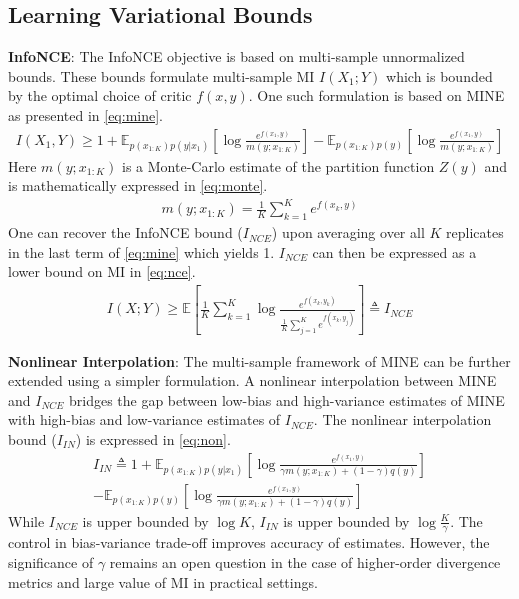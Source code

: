 \documentclass{article}
\begin{document}
\subsection{Learning Variational Bounds}
\textbf{InfoNCE}: The InfoNCE objective is based on multi-sample unnormalized bounds. These bounds formulate multi-sample MI $I(X_{1};Y)$ which is bounded by the optimal choice of critic $f(x,y)$. One such formulation is based on MINE \cite{mine} as presented in \autoref{eq:mine}.
\begin{gather}
  I(X_{1},Y) \geq 1 + \mathbb{E}_{p(x_{1:K})p(y|x_{1})}[\log\frac{e^{f(x_{1},y)}}{m(y;x_{1:K})}] - \mathbb{E}_{p(x_{1:K})p(y)}[\log\frac{e^{f(x_{1},y)}}{m(y;x_{1:K})}] \label{eq:mine}
\end{gather} 
Here $m(y;x_{1:K})$ is a Monte-Carlo estimate of the partition function $Z(y)$ and is mathematically expressed in \autoref{eq:monte}.
\begin{gather}
  m(y;x_{1:K}) = \frac{1}{K}\sum_{k=1}^{K}e^{f(x_{k},y)} \label{eq:monte}
\end{gather}
One can recover the InfoNCE bound ($I_{NCE}$) upon averaging over all $K$ replicates in the last term of \autoref{eq:mine} which yields 1. $I_{NCE}$ can then be expressed as a lower bound on MI in \autoref{eq:nce}.
\begin{gather}
  I(X;Y) \geq \mathbb{E}[\frac{1}{K}\sum_{k=1}^{K}\log\frac{e^{f(x_{k},y_{k})}}{\frac{1}{K}\sum_{j=1}^{K}e^{f(x_{k},y_{j})}}] \triangleq I_{NCE} \label{eq:nce}
\end{gather} 

\textbf{Nonlinear Interpolation}: The multi-sample framework of MINE can be further extended using a simpler formulation. A nonlinear interpolation between MINE and $I_{NCE}$ bridges the gap between low-bias and high-variance estimates of MINE with high-bias and low-variance estimates of $I_{NCE}$. The nonlinear interpolation bound ($I_{IN}$) is expressed in \autoref{eq:non}.
\begin{multline}  
  I_{IN} \triangleq 1 + \mathbb{E}_{p(x_{1:K})p(y|x_{1})}[\log\frac{e^{f(x_{1},y)}}{\gamma m(y;x_{1:K})+(1-\gamma)q(y)}]\\ - \mathbb{E}_{p(x_{1:K})p(y)}[\log\frac{e^{f(x_{1},y)}}{\gamma m(y;x_{1:K})+(1-\gamma)q(y)}] \label{eq:non}
\end{multline}  
While $I_{NCE}$ is upper bounded by $\log K$, $I_{IN}$ is upper bounded by $\log \frac{K}{\gamma}$. The control in bias-variance trade-off improves accuracy of estimates. However, the significance of $\gamma$ remains an open question in the case of higher-order divergence metrics and large value of MI in practical settings. 
\end{document}
